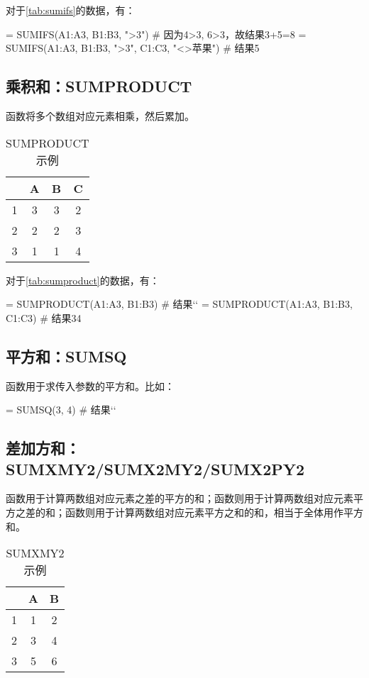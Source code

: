 对于\autoref{tab:sumifs}的数据，有：
\begin{excode}
= SUMIFS(A1:A3, B1:B3, ">3")  # 因为4>3, 6>3，故结果3+5=8
= SUMIFS(A1:A3, B1:B3, ">3", C1:C3, "<>苹果")  # 结果5
\end{excode}

\subsection{乘积和：SUMPRODUCT}
函数将多个数组对应元素相乘，然后累加。

\begin{table}[!hbt]
    \centering
    \caption{SUMPRODUCT示例}\label{tab:sumproduct}
    \begin{tabular}{c|ccc}
    \hline
      & A & B & C \\
    \hline
    1 & 3 & 3 & 2\\
    2 & 2 & 2 & 3\\
    3 & 1 & 1 & 4\\
    \hline
    \end{tabular}
\end{table}

对于\autoref{tab:sumproduct}的数据，有：
\begin{excode}
= SUMPRODUCT(A1:A3, B1:B3)  # 结果``
= SUMPRODUCT(A1:A3, B1:B3, C1:C3)  # 结果34
\end{excode}

\subsection{平方和：SUMSQ}
函数用于求传入参数的平方和。比如：
\begin{excode}
= SUMSQ(3, 4)  # 结果``
\end{excode}

\subsection{差加方和：SUMXMY2/SUMX2MY2/SUMX2PY2}
函数用于计算两数组对应元素之差的平方的和；函数则用于计算两数组对应元素平方之差的和；函数则用于计算两数组对应元素平方之和的和，相当于全体用作平方和。

\begin{table}[!hbt]
    \centering
    \caption{SUMXMY2示例}\label{tab:sumxmy}
    \begin{tabular}{c|cc}
    \hline
      & A & B \\
    \hline
    1 & 1 & 2 \\
    2 & 3 & 4 \\
    3 & 5 & 6 \\
    \hline
    \end{tabular}
\end{table}

